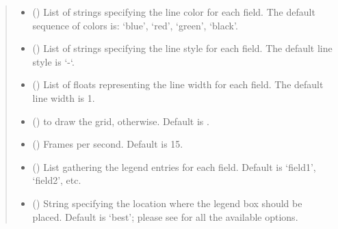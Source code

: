 \documentclass[letterpaper,10pt,english]{sphinxmanual}
\begin{document}
\begin{fulllineitems}
\begin{quote}
\begin{description}
\begin{itemize}
\item {} 
 () \textendash{} List of strings specifying the line color for each field. The default sequence of colors is: ‘blue’, ‘red’, ‘green’, ‘black’.

\item {} 
 () \textendash{} List of strings specifying the line style for each field. The default line style is ‘-‘.

\item {} 
 () \textendash{} List of floats representing the line width for each field. The default line width is 1.

\item {} 
 () \textendash{}  to draw the grid,  otherwise. Default is .

\item {} 
 () \textendash{} Frames per second. Default is 15.

\item {} 
 () \textendash{} List gathering the legend entries for each field. Default is ‘field1’, ‘field2’, etc.

\item {} 
 () \textendash{} String specifying the location where the legend box should be placed. Default is ‘best’;
please see  for all the available options.

\end{itemize}

\end{description}\end{quote}

\end{fulllineitems}

\end{document}
